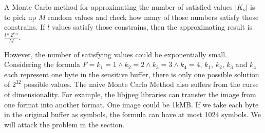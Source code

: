 A Monte Carlo method for approximating the number of satisfied values $|K_o|$ is to pick up 
$M$ random values and check how many of those numbers satisfy those constrains. If $l$ values
satisfy those constrains, then the approximating result is $\frac{l*2^{8m}}{M}$.

However, the number of satisfying values could be exponentially small. Considering the formula
$F={k_1} = 1\land{k_2} = 2\land{k_3} = 3\land{k_4} = 4$, $k_1$, $k_2$, $k_3$ and $k_4$ each represent
one byte in the sensitive buffer, there is only one possible solution of $2^{32}$ possible
values. The naive Monte Carlo Method also suffers from the curse of dimensionality. For example, 
the libjpeg libraries can transfer the image from one format into another format. One image could
be 1kMB. If we take each byte in the original buffer as symbols, the formula can have at most
1024 symbols. We will attack the problem in the section.
